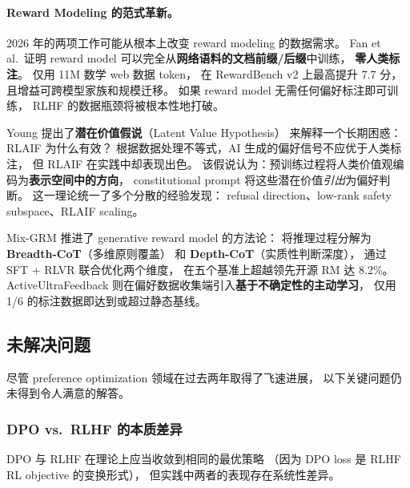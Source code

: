 \paragraph{Reward Modeling 的范式革新。}
2026 年的两项工作可能从根本上改变 reward modeling 的数据需求。
 Fan et al.\ 证明
reward model 可以完全从\textbf{网络语料的文档前缀/后缀}中训练，
\textbf{零人类标注}。
仅用 11M 数学 web 数据 token，
在 RewardBench v2 上最高提升 7.7 分，
且增益可跨模型家族和规模迁移。
如果 reward model 无需任何偏好标注即可训练，
RLHF 的数据瓶颈将被根本性地打破。

 Young 提出了\textbf{潜在价值假说}（Latent Value Hypothesis）
来解释一个长期困惑：RLAIF 为什么有效？
根据数据处理不等式，AI 生成的偏好信号不应优于人类标注，
但 RLAIF 在实践中却表现出色。
该假说认为：预训练过程将人类价值观编码为\textbf{表示空间中的方向}，
constitutional prompt 将这些潜在价值\emph{引出}为偏好判断。
这一理论统一了多个分散的经验发现：
refusal direction、low-rank safety subspace、RLAIF scaling。

Mix-GRM \cite{mixgrm2026} 推进了 generative reward model 的方法论：
将推理过程分解为 \textbf{Breadth-CoT}（多维原则覆盖）
和 \textbf{Depth-CoT}（实质性判断深度），
通过 SFT + RLVR 联合优化两个维度，
在五个基准上超越领先开源 RM 达 8.2\%。
ActiveUltraFeedback \cite{melikidze2026activeuf}
则在偏好数据收集端引入\textbf{基于不确定性的主动学习}，
仅用 1/6 的标注数据即达到或超过静态基线。


\subsection{未解决问题}
\label{sec:t2-open}

尽管 preference optimization 领域在过去两年取得了飞速进展，
以下关键问题仍未得到令人满意的解答。

\subsubsection{DPO vs.\ RLHF 的本质差异}
\label{sec:t2-dpo-vs-rlhf}

DPO 与 RLHF 在理论上应当收敛到相同的最优策略
（因为 DPO loss 是 RLHF RL objective 的变换形式），
但实践中两者的表现存在系统性差异。

